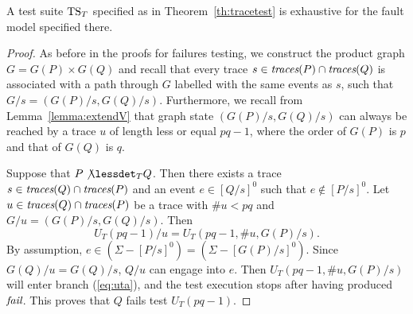 \begin{lemma}\label{lemma:mainfexhaustivetrace}
A test suite ${\text{TS}}_T$ specified as in Theorem~\ref{th:tracetest} is
exhaustive for the fault model specified there.
\end{lemma}
\begin{proof}
As before in the proofs for
failures testing, we construct the product graph $G=G(P)\times G(Q)$ and recall
that every trace $s\in\text{\it traces}(P)\cap\text{\it traces}(Q)$ is associated with a path through $G$ labelled
with the same events as $s$, such that $G/s = (G(P)/s,G(Q)/s)$. Furthermore, we recall from Lemma~\ref{lemma:extendV} that graph state $(G(P)/s,G(Q)/s)$ can always be
reached by a trace $u$ of length less or equal $pq-1$, where  the order of $G(P)$ is $p$ and that of $G(Q)$ is $q$.


Suppose that $P\not\lessdet_T Q$. Then there exists a trace $s\in \text{\it traces}(Q)\cap\text{\it traces}(P)$ and an event $e\in [Q/s]^0$ such that $e\not\in [P/s]^0$. Let $u\in \text{\it traces}(Q)\cap\text{\it traces}(P)$
be a trace with $\#u < pq$ and $G/u = (G(P)/s,G(Q)/s)$. Then 
$$
U_T(pq-1)/u = U_T(pq-1,\#u,G(P)/s).
$$ 
By assumption, 
$e\in (\Sigma -[P/s]^0) = (\Sigma - [G(P)/s]^0)$. 
Since  $G(Q)/u = G(Q)/s$,
 $Q/u$ can engage into $e$. Then $U_T(pq-1,\#u,G(P)/s)$ will enter branch (\ref{eq:uta}), and the test execution stops after having produced ${\text{\it fail}}$. This proves that
  $Q$  fails test $U_T(pq-1)$.
\xbox
\end{proof}

























 
 
